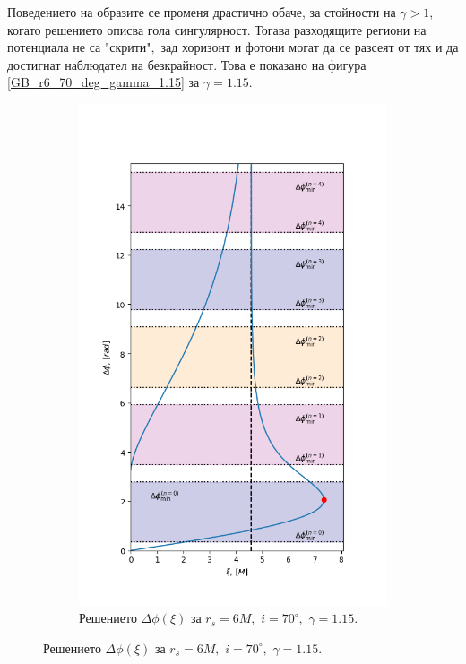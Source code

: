 Поведението на образите се променя драстично обаче, за стойности на $\gamma > 1$, когато решението описва гола сингулярност. Тогава разходящите региони на потенциала не са "скрити"$,$ зад хоризонт и фотони могат да се разсеят от тях и да достигнат наблюдател на безкрайност. Това е показано на фигура \ref{GB_r6_70_deg_gamma_1.15} за $\gamma = 1.15$.

\begin{figure}[!htb]
	\centering
	\begin{subfigure}{6cm}
		\hspace{0.8cm}
		\includegraphics[scale = 0.32]{GB_70_deg_r6_gamma_1.15_impact.png}
		\caption{Решението $\Delta\phi(\xi)$ за $r_s = 6M,\,\, i = 70^\circ,\,\,\gamma = 1.15$.} 

\end{subfigure}
\end{figure}
